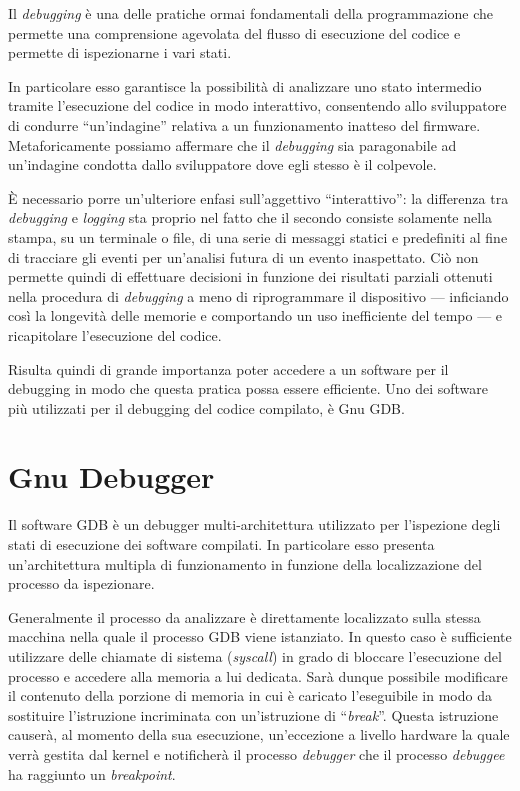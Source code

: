 Il \textit{debugging} è una delle pratiche ormai fondamentali della programmazione che permette una comprensione agevolata del flusso di esecuzione del codice e permette di ispezionarne i vari stati.

In particolare esso garantisce la possibilità di analizzare uno stato intermedio tramite l'esecuzione del codice in modo interattivo, consentendo allo sviluppatore di condurre ``un'indagine'' relativa a un funzionamento inatteso del firmware. Metaforicamente possiamo affermare che il \textit{debugging} sia paragonabile ad un'indagine condotta dallo sviluppatore dove egli stesso è il colpevole.

È necessario porre un'ulteriore enfasi sull'aggettivo ``interattivo'': la differenza tra \textit{debugging} e \textit{logging} sta proprio nel fatto che il secondo consiste solamente nella stampa, su un terminale o file, di una serie di messaggi statici e predefiniti al fine di tracciare gli eventi per un'analisi futura di un evento inaspettato. Ciò non permette quindi di effettuare decisioni in funzione dei risultati parziali ottenuti nella procedura di \textit{debugging} a meno di riprogrammare il dispositivo --- inficiando così la longevità delle memorie e comportando un uso inefficiente del tempo --- e ricapitolare l'esecuzione del codice.

Risulta quindi di grande importanza poter accedere a un software per il debugging in modo che questa pratica possa essere efficiente.
Uno dei software più utilizzati per il debugging del codice compilato, è Gnu GDB\cite{site:gdb}.

\section{Gnu Debugger}\label{sec:gdb}

Il software GDB è un debugger multi-architettura\cite{site:gdb} utilizzato per l'ispezione degli stati di esecuzione dei software compilati.
In particolare esso presenta un'architettura multipla di funzionamento in funzione della localizzazione del processo da ispezionare.

Generalmente il processo da analizzare è direttamente localizzato sulla stessa macchina nella quale il processo GDB viene istanziato. In questo caso è sufficiente utilizzare delle chiamate di sistema (\textit{syscall}) in grado di bloccare l'esecuzione del processo e accedere alla memoria a lui dedicata.
Sarà dunque possibile modificare il contenuto della porzione di memoria in cui è caricato l'eseguibile in modo da sostituire l'istruzione incriminata con un'istruzione di ``\textit{break}''. Questa istruzione causerà, al momento della sua esecuzione, un'eccezione a livello hardware la quale verrà gestita dal kernel e notificherà il processo \textit{debugger} che il processo \textit{debuggee} ha raggiunto un \textit{breakpoint}.

